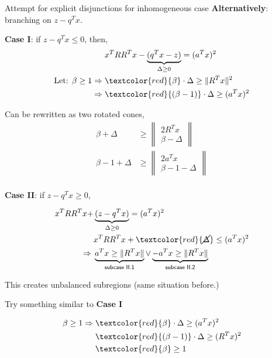 \documentclass[aspectratio=1610, 10pt]{beamer}
\newcommand{\red}[1]{\textcolor{red}{#1}}
\begin{document}
\begin{frame}[allowframebreaks]{Attempt for explicit disjunctions for inhomogeneous case}
  \textbf{Alternatively}: branching on \(z - q^Tx\).

  \textbf{Case I}: if \(z - q^Tx \le 0\), then,
  \begin{align*}
                                           & x^TRR^Tx - \underbrace{(q^Tx - z)}_{\Delta \ge 0} = (a^Tx)^2 \\
    \text{Let: }\beta \ge 1 \Rightarrow \; & \red{\beta}\cdot \Delta\ge \|R^Tx\|^2                        \\
    \Rightarrow \;                         & \red{(\beta - 1)}\cdot\Delta \ge (a^Tx)^2
  \end{align*}

  Can be rewritten as two rotated cones,
  \begin{align*}
    \beta + \Delta     & \ge \left\|\begin{array}{c} 2R^Tx \\ \beta - \Delta \end{array}\right\| \\
    \beta - 1 + \Delta & \ge \left\|\begin{array}{c} 2a^Tx \\ \beta - 1 - \Delta \end{array}\right\| \\
  \end{align*}
  \framebreak

  \textbf{Case II}: if \(z - q^Tx \ge 0\),

  \begin{align*}
    x^TRR^Tx +     & \underbrace{(z - q^Tx)}_{\Delta \ge 0} = (a^Tx)^2      \\
                   & x^TRR^Tx + \red{\cancel{\Delta}} \le (a^Tx)^2          \\
    \Rightarrow \; & \underbrace{a^Tx \ge \|R^Tx\|}_{\textsf{subcase II.1}}
    \vee \underbrace{- a^Tx \ge \|R^Tx\|}_{\textsf{subcase II.2}}           \\
  \end{align*}


  This creates unbalanced subregions (same situation before.)

  \framebreak

  Try something similar to \textbf{Case I}

  \begin{align*}
    \beta \ge 1 \Rightarrow \; & \red{\beta}\cdot\Delta \ge (a^Tx)^2       \\
                               & \red{(\beta - 1)}\cdot\Delta \ge (R^Tx)^2 \\
                               & \red{\beta} \ge 1
  \end{align*}


\end{frame}
\end{document}
